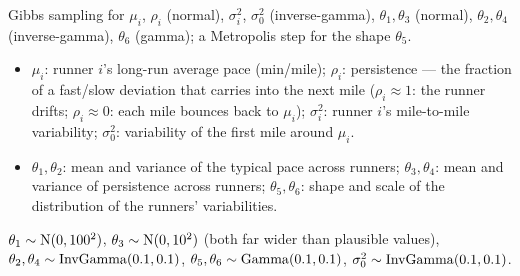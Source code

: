 \documentclass[11pt]{article}
\begin{document}
\begin{keyidea}
Gibbs sampling for $\mu_i$, $\rho_i$ (normal), $\sigma_i^2$, $\sigma_0^2$ (inverse-gamma), $\theta_1,\theta_3$ (normal), $\theta_2,\theta_4$ (inverse-gamma), $\theta_6$ (gamma); a Metropolis step for the shape $\theta_5$.
\end{keyidea}

\solution
{}
\begin{center}
\end{center}
\begin{itemize}
\item $\mu_i$: runner $i$'s long-run average pace (min/mile); $\rho_i$: persistence --- the fraction of a fast/slow deviation that carries into the next mile ($\rho_i\approx1$: the runner drifts; $\rho_i\approx0$: each mile bounces back to $\mu_i$); $\sigma_i^2$: runner $i$'s mile-to-mile variability; $\sigma_0^2$: variability of the first mile around $\mu_i$.
\item $\theta_1,\theta_2$: mean and variance of the typical pace across runners; $\theta_3,\theta_4$: mean and variance of persistence across runners; $\theta_5,\theta_6$: shape and scale of the distribution of the runners' variabilities.
\end{itemize}

 $\theta_1\sim\mathrm{N}(0,100^2)$, $\theta_3\sim\mathrm{N}(0,10^2)$ (both far wider than plausible values), $\theta_2,\theta_4\sim\mathrm{InvGamma}(0.1,0.1)$, $\theta_5,\theta_6\sim\mathrm{Gamma}(0.1,0.1)$, $\sigma_0^2\sim\mathrm{InvGamma}(0.1,0.1)$.
\end{document}

